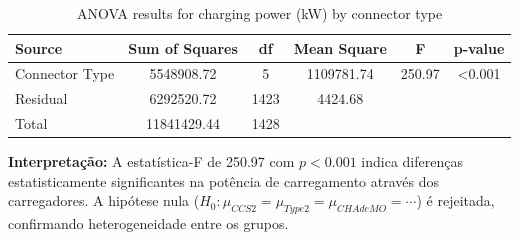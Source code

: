 \begin{table}[h]
\centering
\caption{ANOVA results for charging power (kW) by connector type}
\label{tab:anova_connector}

\begin{tabular}{l S S S S S}
\toprule
{Source} & {Sum of Squares} & {df} & {Mean Square} & {F} & {p-value} \\
\midrule
Connector Type & 5548908.72 & 5 & 1109781.74 & 250.97 & <0.001 \\
Residual       & 6292520.72 & 1423 & 4424.68 & {} & {} \\
\midrule
Total          & 11841429.44 & 1428 & {} & {} & {} \\
\bottomrule
\end{tabular}

\end{table}

\vspace{0.4cm}

\noindent \textbf{Interpretação:} A estatística-F de 250.97 com $p < 0.001$ indica diferenças estatisticamente significantes na potência de carregamento através dos carregadores. A hipótese nula ($H_0: \mu_{CCS2} = \mu_{Type2} = \mu_{CHAdeMO} = \cdots$) é rejeitada, confirmando heterogeneidade entre os grupos.
